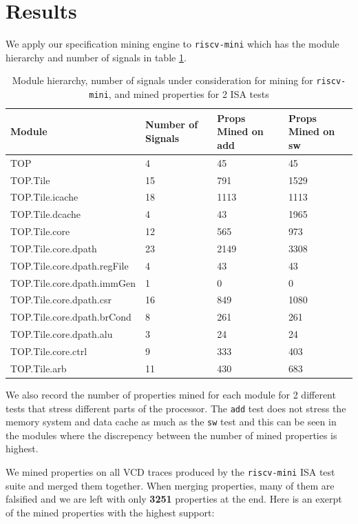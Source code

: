 \documentclass[acmlarge,11pt]{acmart}
\begin{document}
\section{Results}
We apply our specification mining engine to \texttt{riscv-mini} which has the module hierarchy and number of signals in table \ref{tab:riscv-mini}.
\begin{table}
  \caption{Module hierarchy, number of signals under consideration for mining for \texttt{riscv-mini}, and mined properties for 2 ISA tests}
  \label{tab:riscv-mini}
  \begin{tabular}{llll}
    \toprule
    Module & Number of Signals & Props Mined on add & Props Mined on sw\\
    \midrule
    TOP & 4 & 45 & 45 \\
    TOP.Tile & 15 & 791 & 1529 \\
    TOP.Tile.icache & 18 & 1113 & 1113 \\
    TOP.Tile.dcache & 4 & 43 & 1965 \\
    TOP.Tile.core & 12 & 565 & 973 \\
    TOP.Tile.core.dpath & 23 & 2149 & 3308 \\
    TOP.Tile.core.dpath.regFile & 4 & 43 & 43\\
    TOP.Tile.core.dpath.immGen & 1 & 0 & 0 \\
    TOP.Tile.core.dpath.csr & 16 & 849 & 1080 \\
    TOP.Tile.core.dpath.brCond & 8 & 261 & 261\\
    TOP.Tile.core.dpath.alu & 3 & 24 & 24 \\
    TOP.Tile.core.ctrl & 9 & 333 & 403 \\
    TOP.Tile.arb & 11 & 430 & 683 \\
  \bottomrule
  \end{tabular}
\end{table}

We also record the number of properties mined for each module for 2 different tests that stress different parts of the processor.
The \texttt{add} test does not stress the memory system and data cache as much as the \texttt{sw} test and this can be seen in the modules where the discrepency between the number of mined properties is highest.

We mined properties on all VCD traces produced by the \texttt{riscv-mini} ISA test suite and merged them together.
When merging properties, many of them are falsified and we are left with only \textbf{3251} properties at the end.
Here is an exerpt of the mined properties with the highest support:
\end{document}
